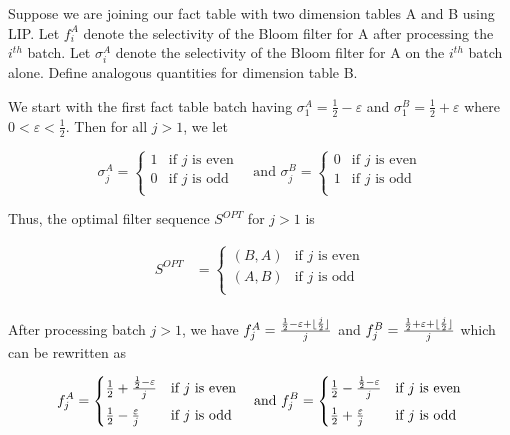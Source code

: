 Suppose we are joining our fact table with two dimension tables A and B using LIP.
Let $f_i^A$ denote the selectivity of the Bloom filter for A after processing the $i^{th}$ batch. 
Let $\sigma_i^A$ denote the selectivity of the Bloom filter for A on the $i^{th}$ batch alone. 
Define analogous quantities for dimension table B.

We start with the first fact table batch having
$\sigma_1^A = \frac{1}{2} - \varepsilon$ and $\sigma_1^B = \frac{1}{2} + \varepsilon$ where $0 < \varepsilon < \frac{1}{2}$. Then for all $j > 1$, we let

\begin{equation*}
\sigma_j^A = 
    \begin{cases}
    1 & \text{if $j$ is even} \\[0.5em]
    0 & \text{if $j$ is odd} \\
    \end{cases} \quad \text{and }
\sigma_j^B = 
    \begin{cases}
    0 & \text{if $j$ is even} \\[0.5em]
    1 &  \text{if $j$ is odd} \\
    \end{cases}
\end{equation*}

Thus, the optimal filter sequence $S^{OPT}$ for $j > 1$ is 

\begin{align*}
S^{OPT} &= 
    \begin{cases}
    (B, A) & \text{if $j$ is even} \\[0.5em]
    (A, B) & \text{if $j$ is odd} \\
    \end{cases}\\[0.5em]
\end{align*}

\DeclarePairedDelimiter\floor{\lfloor}{\rfloor}
After processing batch $j > 1$, we have 
$f_j^A = \frac{\frac{1}{2} - \varepsilon + \floor{\frac{j}{2}}}{j}$ 
and 
$f_j^B = \frac{\frac{1}{2} + \varepsilon + \floor{\frac{j}{2}}}{j}$  
which can be rewritten as

\begin{equation*}
f_j^A = 
    \begin{cases}
    \frac{1}{2} + \frac{\frac{1}{2}-\varepsilon}{j} & \text{if $j$ is even} \\[0.5em]
    \frac{1}{2} - \frac{\varepsilon}{j} &  \text{if $j$ is odd} \\
    \end{cases}  \quad \text{and }
f_j^B = 
    \begin{cases}
    \frac{1}{2} - \frac{\frac{1}{2}-\varepsilon}{j} & \text{if $j$ is even} \\[0.5em]
    \frac{1}{2} + \frac{\varepsilon}{j} &  \text{if $j$ is odd} \\
    \end{cases}\\[0.5em]
\end{equation*}

